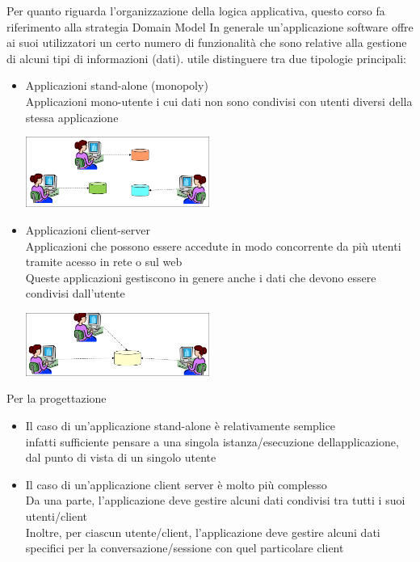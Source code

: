 \documentclass{article}
\begin{document}
\Large Per quanto riguarda l'organizzazione della logica applicativa, questo corso fa riferimento alla strategia Domain Model\normalsize\acapo
In generale un'applicazione software offre ai suoi utilizzatori un certo numero di funzionalità che sono relative alla gestione di alcuni tipi di informazioni (dati).\newpage
\Eaccentata utile distinguere tra due tipologie principali:
\begin{itemize}
    \item Applicazioni stand-alone (monopoly)\\
        Applicazioni mono-utente i cui dati non sono condivisi con utenti diversi della stessa applicazione
        \begin{center}
            \includegraphics[width=6cm]{images/applicazioni standalone.png}
        \end{center}
    \item Applicazioni client-server\\
        Applicazioni che possono essere accedute in modo concorrente da più utenti tramite acesso in rete o sul web\\
        Queste applicazioni gestiscono in genere anche i dati che devono essere condivisi dall'utente
        \begin{center}
            \includegraphics[width=6cm]{images/applicazioni client server.png}
        \end{center}
\end{itemize}
Per la progettazione
\begin{itemize}
    \item Il caso di un'applicazione stand-alone è relativamente semplice\\
        \Eaccentata infatti sufficiente pensare a una singola istanza/esecuzione dellapplicazione, dal punto di vista di un singolo utente
    \item Il caso di un'applicazione client server è molto più complesso\\
        Da una parte, l'applicazione deve gestire alcuni dati condivisi tra tutti i suoi utenti/client\\
        Inoltre, per ciascun utente/client, l'applicazione deve gestire alcuni dati specifici per la conversazione/sessione con quel particolare client
\end{itemize}
\end{document}
